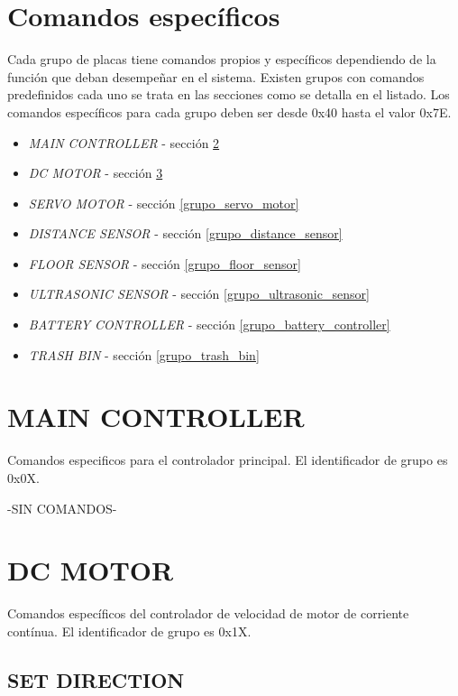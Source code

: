 \documentclass[a4paper,10pt]{article}
\begin{document}
\section{Comandos espec\'ificos}
\label{comandos_especificos}

Cada grupo de placas tiene comandos propios y espec\'ificos dependiendo de la funci\'on que deban desempe\~nar en el sistema.
Existen grupos con comandos predefinidos cada uno se trata en las secciones como se detalla en el listado.
Los comandos espec\'ificos para cada grupo deben ser desde 0x40 hasta el valor 0x7E.

\begin{itemize}
	\item \emph{MAIN CONTROLLER} - secci\'on \ref{grupo_main_controller}
	\item \emph{DC MOTOR} - secci\'on \ref{grupo_dc_motor}
	\item \emph{SERVO MOTOR} - secci\'on \ref{grupo_servo_motor}
	\item \emph{DISTANCE SENSOR} - secci\'on \ref{grupo_distance_sensor}
	\item \emph{FLOOR SENSOR} - secci\'on \ref{grupo_floor_sensor}
	\item \emph{ULTRASONIC SENSOR} - secci\'on \ref{grupo_ultrasonic_sensor}
	\item \emph{BATTERY CONTROLLER} - secci\'on \ref{grupo_battery_controller}
	\item \emph{TRASH BIN} - secci\'on \ref{grupo_trash_bin}
\label{grupos_listado}
\end{itemize}

\section{MAIN CONTROLLER}
\label{grupo_main_controller}

Comandos especificos para el controlador principal.
El identificador de grupo es 0x0X.


-SIN COMANDOS-


\section{DC MOTOR}
\label{grupo_dc_motor}

Comandos espec\'ificos del controlador de velocidad de motor de corriente cont\'inua.
El identificador de grupo es 0x1X.

\subsection{SET DIRECTION}
\label{set_direction}
\end{document}
